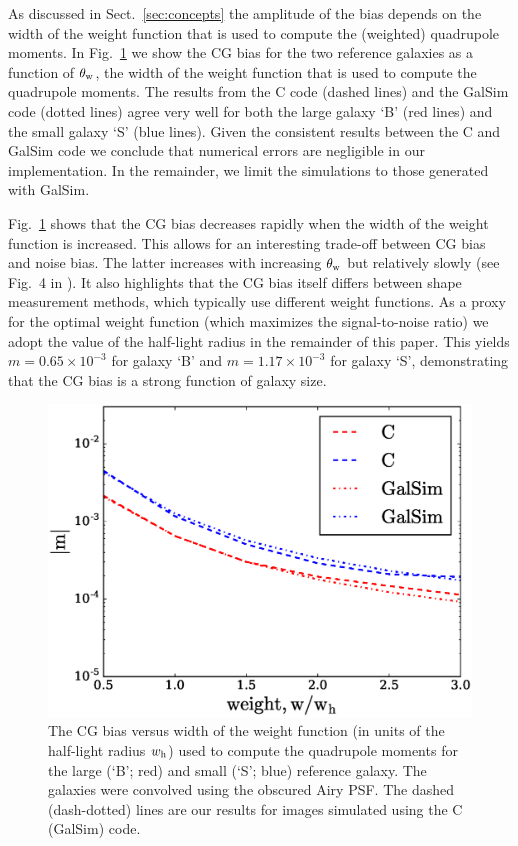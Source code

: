 \documentclass[useAMS,usenatbib]{mnras}
\begin{document}
As discussed in Sect.~\ref{sec:concepts} the amplitude of the bias depends on the width of the weight function that is used to compute the (weighted) quadrupole moments. In Fig.~\ref{fig:biasofweight} we show the CG bias for the two reference galaxies as a function of $\theta_{\rm w}$, the width of the weight function that is used to compute the quadrupole moments. The results from the {\sc C} code (dashed lines) and the {\sc GalSim} code (dotted lines) agree very well for both the large galaxy `B' (red lines) and the small galaxy `S' (blue lines). Given the consistent results between the {\sc C} and {\sc GalSim} code we conclude that numerical errors are negligible in our implementation. In the remainder, we limit the simulations to those generated with {\sc GalSim}.

Fig.~\ref{fig:biasofweight} shows that the CG bias decreases rapidly when the width of the weight function is increased. This allows for an interesting trade-off between CG bias and noise bias. The latter increases with increasing $\theta_{\rm w}$ but relatively slowly (see Fig.~4 in ). It also highlights that the CG bias itself differs between shape measurement methods, which typically use different weight functions. As a proxy for the optimal weight function (which maximizes the signal-to-noise ratio) we adopt the value of the  half-light radius in the remainder of this paper. This yields $m=0.65\times10^{-3}$ for galaxy `B' and $m=1.17\times10^{-3}$ for galaxy `S', demonstrating that the CG bias is a strong function of galaxy size.

%
\begin{figure}
  \centerline{\includegraphics[width=\hsize]{zweight_airy.eps}}
\caption{The CG bias versus width of the weight function (in
  units of the half-light radius $w_{\rm h}$) used to compute the
  quadrupole moments for the large (`B'; red) and small (`S';
  blue) reference galaxy. The galaxies were convolved using the obscured Airy
  PSF. The dashed (dash-dotted) lines are our
  results for images simulated using the {\sc C} ({\sc GalSim}) code.}
\label{fig:biasofweight}
\end{figure}
%
\end{document}
